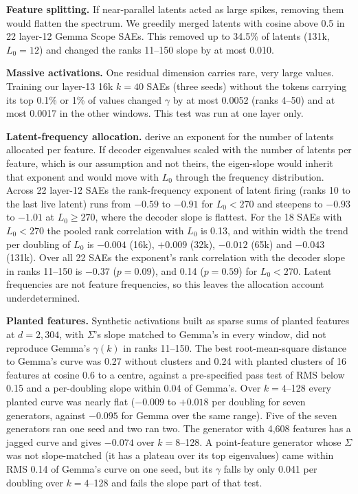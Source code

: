 \documentclass[10pt,twocolumn]{article}
\newcommand{\Sig}{\Sigma}
\newcommand{\Lz}{L_0}
\begin{document}
\textbf{Feature splitting.} If near-parallel latents acted as large spikes, removing them would flatten the spectrum. We greedily merged latents with cosine above 0.5 in 22 layer-12 Gemma Scope SAEs. This removed up to 34.5\% of latents (131k, $\Lz=12$) and changed the ranks 11--150 slope by at most 0.010.

\textbf{Massive activations.} One residual dimension carries rare, very large values. Training our layer-13 16k $k=40$ SAEs (three seeds) without the tokens carrying its top 0.1\% or 1\% of values changed $\gamma$ by at most 0.0052 (ranks 4--50) and at most 0.0017 in the other windows. This test was run at one layer only.

\textbf{Latent-frequency allocation.} \citet{michaud2025manifolds} derive an exponent for the number of latents allocated per feature. If decoder eigenvalues scaled with the number of latents per feature, which is our assumption and not theirs, the eigen-slope would inherit that exponent and would move with $\Lz$ through the frequency distribution. Across 22 layer-12 SAEs the rank-frequency exponent of latent firing (ranks 10 to the last live latent) runs from $-0.59$ to $-0.91$ for $\Lz < 270$ and steepens to $-0.93$ to $-1.01$ at $\Lz \ge 270$, where the decoder slope is flattest. For the 18 SAEs with $\Lz < 270$ the pooled rank correlation with $\Lz$ is 0.13, and within width the trend per doubling of $\Lz$ is $-0.004$ (16k), $+0.009$ (32k), $-0.012$ (65k) and $-0.043$ (131k). Over all 22 SAEs the exponent's rank correlation with the decoder slope in ranks 11--150 is $-0.37$ ($p=0.09$), and 0.14 ($p=0.59$) for $\Lz < 270$. Latent frequencies are not feature frequencies, so this leaves the allocation account underdetermined.

\textbf{Planted features.} Synthetic activations built as sparse sums of planted features at $d=2{,}304$, with $\Sig$'s slope matched to Gemma's in every window, did not reproduce Gemma's $\gamma(k)$ in ranks 11--150. The best root-mean-square distance to Gemma's curve was 0.27 without clusters and 0.24 with planted clusters of 16 features at cosine 0.6 to a centre, against a pre-specified pass test of RMS below 0.15 and a per-doubling slope within 0.04 of Gemma's. Over $k=4$--128 every planted curve was nearly flat ($-0.009$ to $+0.018$ per doubling for seven generators, against $-0.095$ for Gemma over the same range). Five of the seven generators ran one seed and two ran two. The generator with 4,608 features has a jagged curve and gives $-0.074$ over $k=8$--128. A point-feature generator whose $\Sig$ was not slope-matched (it has a plateau over its top eigenvalues) came within RMS 0.14 of Gemma's curve on one seed, but its $\gamma$ falls by only 0.041 per doubling over $k=4$--128 and fails the slope part of that test.
\end{document}
